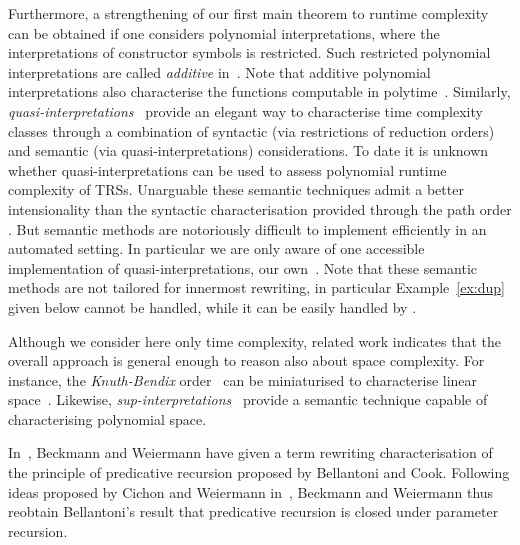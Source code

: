 \documentclass{LMCS}
\begin{document}
Furthermore, a strengthening of our first main theorem to
runtime complexity can be obtained
if one considers polynomial interpretations, where the interpretations of
constructor symbols is restricted. Such restricted polynomial interpretations
are called \emph{additive} in~\cite{BCMT01}. Note that additive polynomial interpretations
also characterise the functions computable in polytime~\cite{BCMT01}.
Similarly, \emph{quasi-interpretations}~\cite{BMM11} provide an elegant way to characterise
time complexity classes through a combination of syntactic (via restrictions of reduction
orders) and semantic (via quasi-interpretations) considerations. 
To date it is unknown whether quasi-interpretations can be used to assess polynomial runtime complexity
of TRSs. 
Unarguable these semantic techniques admit a better intensionality than the
syntactic characterisation provided through the path order \POPSTAR. 
But semantic methods are notoriously 
difficult to implement efficiently in an automated setting. In particular
we are only aware of one accessible implementation of quasi-interpretations,
our own~\cite{AMS08}. Note that these semantic methods are
not tailored for innermost rewriting, in particular Example~\ref{ex:dup} 
given below cannot be handled, while it can be easily handled by \POPSTAR.

Although we consider here only time complexity, related work 
indicates that the overall approach is general enough to reason also about space complexity.
For instance, the \emph{Knuth-Bendix} order~\cite{BN98} can be miniaturised to characterise linear space~\cite{BonfanteMoser:2010}.
Likewise, \emph{sup-interpretations}~\cite{MP:09} provide a 
semantic technique capable of characterising polynomial space. 

In~\cite{BW96}, Beckmann and Weiermann have given a term rewriting characterisation
of the principle of predicative recursion proposed by Bellantoni and Cook. 
Following ideas proposed by Cichon and Weiermann in~\cite{CW97}, Beckmann and Weiermann
thus reobtain Bellantoni's result that predicative recursion is closed
under parameter recursion. 
\end{document}
